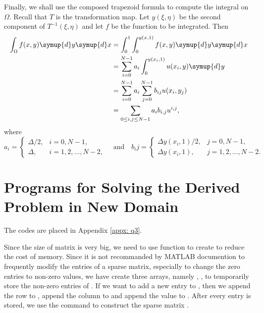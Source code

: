 \documentclass{assignment}[2019/10/15]
\begin{document}
    Finally, we shall use the composed trapezoid formula to compute the integral on $\Omega$. Recall that $T$ is the transformation map. Let $y(\xi, \eta)$ be the second component of $T^{-1}(\xi, \eta)$ and let $f$ be the function to be integrated. Then
    \begin{equation}\label{eq: ctf}
        \begin{aligned}
            \int_{\Omega}f(x, y)\symup{d}y\symup{d}x
            &= \int_0^1\int_0^{y(x, 1)}f(x, y)\symup{d}y\symup{d}x\\
            &= \sum_{i=0}^{N-1}a_i\int_0^{y(x_i, 1)}u(x_i, y)\symup{d}y\\
            &= \sum_{i=0}^{N-1}a_i\sum_{j=0}^{N-1}b_{ij}u(x_i, y_j)\\
            &= \sum_{0\leq i, j\leq N-1}a_ib_{i,j}u^{i,j},
        \end{aligned}
    \end{equation}
    where
    \begin{equation}
        a_i =
        \begin{cases}
            \Delta/2, &i = 0, N-1,\\
            \Delta, &i = 1, 2, \dotsc, N-2,
        \end{cases}
        \quad\text{and}\quad
        b_ij=
        \begin{cases}
            \Delta y(x_i, 1)/2, &j = 0, N-1,\\
            \Delta y(x_i, 1), &j = 1, 2, \dotsc, N-2.
        \end{cases}
    \end{equation}

    \section{Programs for Solving the Derived Problem in New Domain}

    The codes are placed in Appendix \ref{appx: q3}.

    Since the size of matrix  is very big, we need to use  function to create  to reduce the cost of memory. Since it is not recommanded by MATLAB documention to frequently modify the entries of a sparse matrix, especially to change the zero entries to non-zero values, we have create three arrays, namely , ,  to temporarily store the non-zero entries of . If we want to add a new entry to , then we append the row to , append the column to  and append the value to . After every entry is stored, we use the command  to construct the sparse matrix .
\end{document}
